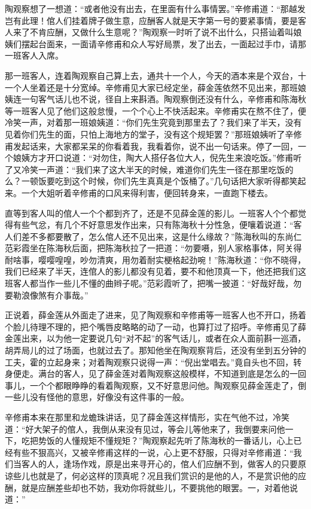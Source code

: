 \documentclass[12pt,UTF8]{ctexbook}
\begin{document}
{{{陶观察想了一想道：“或者他没有出去，在里面有什么事情罢。”辛修甫道：“那越发岂有此理！倌人们挂着牌子做生意，应酬客人就是天字第一号的要紧事情，要是客人来了不肯应酬，又做什么生意呢？”陶观察一时听了说不出什么，只搭讪着叫娘姨们摆起台面来，一面请辛修甫和众人写好局票，发了出去，一面起过手巾，请那一班客人入席。

那一班客人，连着陶观察自己算上去，通共十一个人，今天的酒本来是个双台，十一个人坐着还是十分宽绰。辛修甫见大家已经定坐，薛金莲依然不见出来，那班娘姨连一句客气话儿也不说，径自上来斟酒。陶观察倒还没有什么，辛修甫和陈海秋等一班客人见了他们这般怠慢，一个个心上不快活起来。辛修甫实在熬不住了，便冷笑一声，对着那一班娘姨道：“你们先生究竟到那里去了？我们来了半天，没有见着你们先生的面，只怕上海地方的堂子，没有这个规矩罢？”那班娘姨听了辛修甫发起话来，大家都呆呆的你看着我，我看着你，说不出一句话来。停了一回，一个娘姨方才开口说道：“对勿住，陶大人搭仔各位大人，倪先生来浪吃饭。”修甫听了又冷笑一声道：“我们来了这大半天的时候，难道你们先生一径在那里吃饭的么？一顿饭要吃到这个时候，你们先生真真是个饭桶了。”几句话把大家听得都笑起来。一个大姐听着辛修甫的口风来得利害，便回转身来，一直跑下楼去。

直等到客人叫的倌人一个个都到齐了，还是不见薛金莲的影儿。一班客人个个都觉得有些气忿，有几个不好意思发作出来，只有陈海秋十分性急，便嚷着说道：“客人们差不多都要散了，怎么倌人还不见出来，这是什么缘故？”陈海秋叫的东尚仁范彩霞坐在陈海秋后面，把陈海秋拉了一把道：“勿要嗫，别人家格事体，阿关得耐啥事，嘤嘤喤喤，吵勿清爽，用勿着耐实梗格起劲啘！”陈海秋道：“你不晓得，我们已经来了半天，连倌人的影儿都没有见着，要不和他顶真一下，他还把我们这班客人都当作一些儿不懂的曲辫子呢。”范彩霞听了，把嘴一披道：“好哉好哉，勿要勒浪像煞有介事哉。”

正说着，薛金莲从外面走了进来，见了陶观察和辛修甫等一班客人也不开口，扬着个脸儿待理不理的，把个嘴唇皮略略的动了一动，也算打过了招呼。辛修甫见了薛金莲出来，以为他一定要说几句“对不起”的客气话儿，或者在众人面前斟一巡酒，胡弄局儿的过了场面，也就过去了。那知他坐在陶观察背后，还没有坐到五分钟的工夫，霍的立起身来；对着陶观察只说得一声：“倪出堂唱去。”竟自头也不回，转身便走。满台的客人，见了薛金莲对着陶观察这般模样，不知道到底是怎么的一回事儿，一个个都眼睁睁的看着陶观察，又不好意思问他。陶观察见薛金莲走了，倒一些儿没有怪他的意思，好像没有这件事的一般。

辛修甫本来在那里和龙蟾珠讲话，见了薛金莲这样情形，实在气他不过，冷笑道：“好大架子的倌人，我倒从来没有见过，等会儿等他来了，我倒要来问他一下，吃把势饭的人懂规矩不懂规矩？”陶观察起先听了陈海秋的一番话儿，心上已经有些不狠高兴，又被辛修甫这样的一说，心上更不舒服，只得对辛修甫道：“我们当客人的人，逢场作戏，原是出来寻开心的，倌人们应酬不到，做客人的只要原谅些儿也就是了，何必这样的顶真呢？况且我们赏识的是他的人，不是赏识他的应酬，就是应酬差些却也不妨，我劝你将就些儿，不要挑他的眼罢。一，对着他说道：”

}}}
\end{document}
